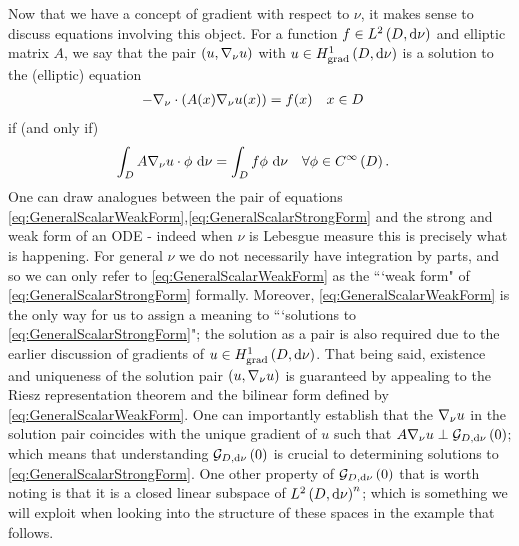 Now that we have a concept of gradient with respect to $\nu$, it makes sense to discuss equations involving this object.
For a function $f\in L^{2}\left( D,\mathrm{d}\nu \right)$ and elliptic matrix $A$, we say that the pair $\left( u,\nabla_\nu u \right)$ with $u\in H^1_\mathrm{grad}\left( D, \mathrm{d}\nu \right)$ is a solution to the (elliptic) equation
\begin{align} \label{eq:GeneralScalarStrongForm}
	-\nabla_\nu \cdot \left( A(x)\nabla_\nu u(x) \right) &= f(x) \quad x\in D
\end{align}
if (and only if)
\begin{align} \label{eq:GeneralScalarWeakForm}
	\int_{D}A\nabla_\nu u \cdot \phi \ \mathrm{d}\nu &= \int_{D}f\phi \ \mathrm{d}\nu \quad \forall \phi\in C^{\infty}\left( D \right).
\end{align}
One can draw analogues between the pair of equations \eqref{eq:GeneralScalarWeakForm},\eqref{eq:GeneralScalarStrongForm} and the strong and weak form of an ODE - indeed when $\nu$ is Lebesgue measure this is precisely what is happening.
For general $\nu$ we do not necessarily have integration by parts, and so we can only refer to \eqref{eq:GeneralScalarWeakForm} as the ```weak form" of \eqref{eq:GeneralScalarStrongForm} formally.
Moreover, \eqref{eq:GeneralScalarWeakForm} is the only way for us to assign a meaning to ```solutions to \eqref{eq:GeneralScalarStrongForm}"; the solution as a pair is also required due to the earlier discussion of gradients of $u\in H^1_\mathrm{grad}\left( D, \mathrm{d}\nu \right)$.
That being said, existence and uniqueness of the solution pair $\left( u,\nabla_\nu u \right)$ is guaranteed by appealing to the Riesz representation theorem and the bilinear form defined by \eqref{eq:GeneralScalarWeakForm}.
One can  importantly establish that the $\nabla_\nu u$ in the solution pair coincides with the unique gradient of $u$ such that $A\nabla_\nu u \perp \mathcal{G}_{ D, \mathrm{d}\nu}\left( 0 \right)$; which means that understanding $\mathcal{G}_{ D, \mathrm{d}\nu}\left( 0 \right)$ is crucial to determining solutions to \eqref{eq:GeneralScalarStrongForm}.
One other property of $\mathcal{G}_{ D, \mathrm{d}\nu}\left( 0 \right)$ that is worth noting is that it is a closed linear subspace of $L^{2}\left( D,\mathrm{d}\nu \right)^n$; which is something we will exploit when looking into the structure of these spaces in the example that follows.


